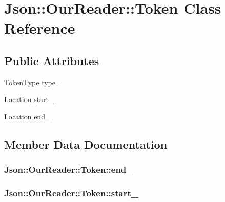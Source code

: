 \hypertarget{classJson_1_1OurReader_1_1Token}{}\section{Json\+:\+:Our\+Reader\+:\+:Token Class Reference}
\label{classJson_1_1OurReader_1_1Token}
\subsection*{Public Attributes}
\begin{DoxyCompactItemize}
\item 
\hyperlink{classJson_1_1OurReader_a15116f7276ddf1e7a2cc3cbefa884dcc}{Token\+Type} \hyperlink{classJson_1_1OurReader_1_1Token_abe7d858530396fa7e1293f7a579880ed}{type\+\_\+}
\item 
\hyperlink{classJson_1_1OurReader_a1bdc7bbc52ba87cae6b19746f2ee0189}{Location} \hyperlink{classJson_1_1OurReader_1_1Token_aedf68bb00eaaa9d3c22b9825999602ac}{start\+\_\+}
\item 
\hyperlink{classJson_1_1OurReader_a1bdc7bbc52ba87cae6b19746f2ee0189}{Location} \hyperlink{classJson_1_1OurReader_1_1Token_a67d2071638add857528579ae3791eccc}{end\+\_\+}
\end{DoxyCompactItemize}


\subsection{Member Data Documentation}
\subsubsection[{\texorpdfstring{end\+\_\+}{end_}}]{ Json\+::\+Our\+Reader\+::\+Token\+::end\+\_\+}\hypertarget{classJson_1_1OurReader_1_1Token_a67d2071638add857528579ae3791eccc}{}\label{classJson_1_1OurReader_1_1Token_a67d2071638add857528579ae3791eccc}
\subsubsection[{\texorpdfstring{start\+\_\+}{start_}}]{ Json\+::\+Our\+Reader\+::\+Token\+::start\+\_\+}\hypertarget{classJson_1_1OurReader_1_1Token_aedf68bb00eaaa9d3c22b9825999602ac}{}\label{classJson_1_1OurReader_1_1Token_aedf68bb00eaaa9d3c22b9825999602ac}
